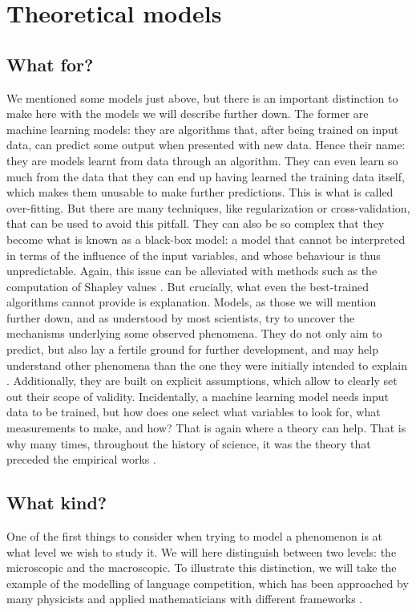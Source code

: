 \documentclass[../thesis.tex]{subfiles}
\begin{document}

\section{Theoretical models}


\subsection{What for?}
We mentioned some models just above, but there is an important distinction to make here
with the models we will describe further down. The former are machine learning models:
they are algorithms that, after being trained on input data, can predict some output
when presented with new data. Hence their name: they are models learnt from data through
an algorithm. They can even learn so much from the data that they can end up having
learned the training data itself, which makes them unusable to make further predictions.
This is what is called over-fitting. But there are many techniques, like regularization or
cross-validation, that can be used to avoid this pitfall. They can also be so complex
that they become what is known as a black-box model: a model that cannot be interpreted
in terms of the influence of the input variables, and whose behaviour is thus
unpredictable. Again, this issue can be alleviated with methods such as the computation
of Shapley values \cite{ShapleyNotesNPerson1951,StrumbeljExplainingPrediction2014}. But
crucially, what even the best-trained algorithms cannot provide is explanation. Models,
as those we will mention further down, and as understood by most scientists, try to
uncover the mechanisms underlying some observed phenomena. They do not only aim to
predict, but also lay a fertile ground for further development, and may help
understand other phenomena than the one they were initially intended to explain
\cite{EpsteinWhyModel2008}. Additionally, they are built on explicit assumptions, which
allow to clearly set out their scope of validity. Incidentally, a machine learning model
needs input data to be trained, but how does one select what variables to look for, what
measurements to make, and how? That is again where a theory can help. That is why many
times, throughout the history of science, it was the theory that preceded the empirical
works \cite{EpsteinWhyModel2008}.


\subsection{What kind?}
One of the first things to consider when trying to model a phenomenon is at what level
we wish to study it. %
We will here distinguish between two levels: the microscopic and the macroscopic. To
illustrate this distinction, we will take the example of the modelling of language
competition, which has been approached by many physicists and applied mathematicians
with different frameworks
\cite{CastellanoStatisticalPhysics2009,BoissonneaultSystematicInterdisciplinary2021}.
\end{document}
